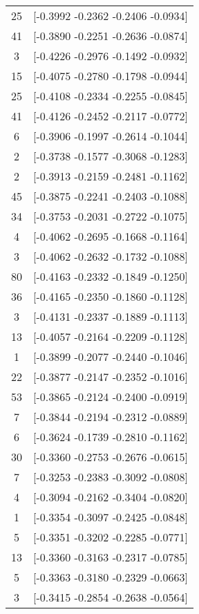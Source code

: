 \documentclass[12pt, fullpage,letterpaper]{article}
\begin{document}
\begin{enumerate}
\begin{enumerate}
{\begin{longtable}{|c|c|}
			 25 &  [-0.3992 -0.2362 -0.2406 -0.0934] \\
			 41 &  [-0.3890 -0.2251 -0.2636 -0.0874] \\
			  3 &  [-0.4226 -0.2976 -0.1492 -0.0932] \\
			 15 &  [-0.4075 -0.2780 -0.1798 -0.0944] \\
			 25 &  [-0.4108 -0.2334 -0.2255 -0.0845] \\
			 41 &  [-0.4126 -0.2452 -0.2117 -0.0772] \\
			  6 &  [-0.3906 -0.1997 -0.2614 -0.1044] \\
			  2 &  [-0.3738 -0.1577 -0.3068 -0.1283] \\
			  2 &  [-0.3913 -0.2159 -0.2481 -0.1162] \\
			 45 &  [-0.3875 -0.2241 -0.2403 -0.1088] \\
			 34 &  [-0.3753 -0.2031 -0.2722 -0.1075] \\
			  4 &  [-0.4062 -0.2695 -0.1668 -0.1164] \\
			  3 &  [-0.4062 -0.2632 -0.1732 -0.1088] \\
			 80 &  [-0.4163 -0.2332 -0.1849 -0.1250] \\
			 36 &  [-0.4165 -0.2350 -0.1860 -0.1128] \\
			  3 &  [-0.4131 -0.2337 -0.1889 -0.1113] \\
			 13 &  [-0.4057 -0.2164 -0.2209 -0.1128] \\
			  1 &  [-0.3899 -0.2077 -0.2440 -0.1046] \\
			 22 &  [-0.3877 -0.2147 -0.2352 -0.1016] \\
			 53 &  [-0.3865 -0.2124 -0.2400 -0.0919] \\
			  7 &  [-0.3844 -0.2194 -0.2312 -0.0889] \\
			  6 &  [-0.3624 -0.1739 -0.2810 -0.1162] \\
			 30 &  [-0.3360 -0.2753 -0.2676 -0.0615] \\
			  7 &  [-0.3253 -0.2383 -0.3092 -0.0808] \\
			  4 &  [-0.3094 -0.2162 -0.3404 -0.0820] \\
			  1 &  [-0.3354 -0.3097 -0.2425 -0.0848] \\
			  5 &  [-0.3351 -0.3202 -0.2285 -0.0771] \\
			 13 &  [-0.3360 -0.3163 -0.2317 -0.0785] \\
			  5 &  [-0.3363 -0.3180 -0.2329 -0.0663] \\
			  3 &  [-0.3415 -0.2854 -0.2638 -0.0564] \\

\end{longtable}}
\end{enumerate}
\end{enumerate}
\end{document}
